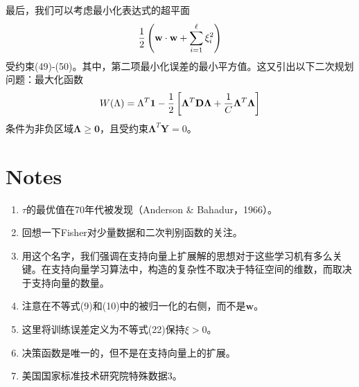 \documentclass[lang=cn,11pt,a4paper]{elegantpaper}
\begin{document}
	最后，我们可以考虑最小化表达式的超平面
	\begin{equation}
		\frac{1}{2}\left(\mathbf{w} \cdot \mathbf{w}+\sum_{i=1}^{\ell} \xi_{i}^{2}\right)\notag
	\end{equation}
	受约束(49)-(50)。其中，第二项最小化误差的最小平方值。这又引出以下二次规划问题：最大化函数
	\begin{equation}
		W(\Lambda)=\Lambda^{T} \mathbf{1}-\frac{1}{2}\left[\mathbf{\Lambda}^{T} \mathbf{D} \mathbf{\Lambda}+\frac{1}{C} \mathbf{\Lambda}^{T} \mathbf{\Lambda}\right]\notag
	\end{equation}
	条件为非负区域$\mathbf{\Lambda}\geq\mathbf{0}$，且受约束$\mathbf{\Lambda}^T\mathbf{Y}=0$。

	\section*{Notes}
	\begin{enumerate}
		\item $\tau$的最优值在70年代被发现（Anderson \& Bahadur，1966）。
		\item 回想一下Fisher对少量数据和二次判别函数的关注。
		\item 用这个名字，我们强调在支持向量上扩展解的思想对于这些学习机有多么关键。在支持向量学习算法中，构造的复杂性不取决于特征空间的维数，而取决于支持向量的数量。
		\item 注意在不等式(9)和(10)中的被归一化的右侧，而不是$\mathbf{w}$。
		\item 这里将训练误差定义为不等式(22)保持$\xi>0$。
		\item 决策函数是唯一的，但不是在支持向量上的扩展。
		\item 美国国家标准技术研究院特殊数据3。
	\end{enumerate}
\end{document}
